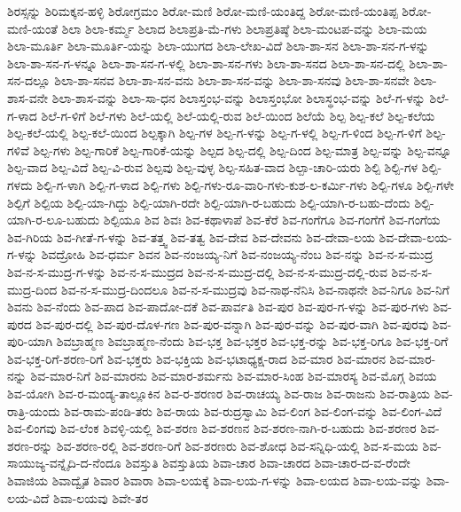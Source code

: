 ಶಿರಸ್ಸನ್ನು
ಶಿರಿಮಕ್ಕನ-ಹಳ್ಳಿ
ಶಿರೋಗ್ರಮಂ
ಶಿರೋ-ಮಣಿ
ಶಿರೋ-ಮಣಿ-ಯಂತಿದ್ದ
ಶಿರೋ-ಮಣಿ-ಯಂತಿಪ್ಪ
ಶಿರೋ-ಮಣಿ-ಯಂತೆ
ಶಿಲಾ
ಶಿಲಾ-ಕರ್ಮ್ಮ
ಶಿಲಾದ
ಶಿಲಾಪ್ರತಿ-ಮೆ-ಗಳು
ಶಿಲಾಪ್ರತಿಷ್ಠೆ
ಶಿಲಾ-ಮಂಟಪ-ವನ್ನು
ಶಿಲಾ-ಮಯ
ಶಿಲಾ-ಮೂರ್ತಿ
ಶಿಲಾ-ಮೂರ್ತಿ-ಯನ್ನು
ಶಿಲಾ-ಯುಗದ
ಶಿಲಾ-ಲೇಖ-ವಿದೆ
ಶಿಲಾ-ಶಾ-ಸನ
ಶಿಲಾ-ಶಾ-ಸನ-ಗ-ಳನ್ನು
ಶಿಲಾ-ಶಾ-ಸನ-ಗ-ಳನ್ನೂ
ಶಿಲಾ-ಶಾ-ಸನ-ಗ-ಳಲ್ಲಿ
ಶಿಲಾ-ಶಾ-ಸನ-ಗಳು
ಶಿಲಾ-ಶಾ-ಸನದ
ಶಿಲಾ-ಶಾ-ಸನ-ದಲ್ಲಿ
ಶಿಲಾ-ಶಾ-ಸನ-ದಲ್ಲೂ
ಶಿಲಾ-ಶಾ-ಸನವ
ಶಿಲಾ-ಶಾ-ಸನ-ವನು
ಶಿಲಾ-ಶಾ-ಸನ-ವನ್ನು
ಶಿಲಾ-ಶಾ-ಸನವು
ಶಿಲಾ-ಶಾ-ಸನವೇ
ಶಿಲಾ-ಶಾಸ-ವನೇ
ಶಿಲಾ-ಶಾಸ-ವನ್ನು
ಶಿಲಾ-ಸಾ-ಧನ
ಶಿಲಾಸ್ತಂಭ-ವನ್ನು
ಶಿಲಾಸ್ತಂಭೋ
ಶಿಲಾಸ್ಥಂಭ-ವನ್ನು
ಶಿಲೆ-ಗ-ಳನ್ನು
ಶಿಲೆ-ಗ-ಳಾದ
ಶಿಲೆ-ಗ-ಳಿಗೆ
ಶಿಲೆ-ಗಳು
ಶಿಲೆ-ಯಲ್ಲಿ
ಶಿಲೆ-ಯಲ್ಲಿ-ರುವ
ಶಿಲೆ-ಯಿಂದ
ಶಿಲೆಯೆ
ಶಿಲ್ಪ
ಶಿಲ್ಪ-ಕಲೆ
ಶಿಲ್ಪ-ಕಲೆಯ
ಶಿಲ್ಪ-ಕಲೆ-ಯಲ್ಲಿ
ಶಿಲ್ಪ-ಕಲೆ-ಯಿಂದ
ಶಿಲ್ಪಕ್ಕಾಗಿ
ಶಿಲ್ಪ-ಗಳ
ಶಿಲ್ಪ-ಗ-ಳನ್ನು
ಶಿಲ್ಪ-ಗ-ಳಲ್ಲಿ
ಶಿಲ್ಪ-ಗ-ಳಿಂದ
ಶಿಲ್ಪ-ಗ-ಳಿಗೆ
ಶಿಲ್ಪ-ಗಳಿವೆ
ಶಿಲ್ಪ-ಗಳು
ಶಿಲ್ಪ-ಗಾರಿಕೆ
ಶಿಲ್ಪ-ಗಾರಿಕೆ-ಯನ್ನು
ಶಿಲ್ಪದ
ಶಿಲ್ಪ-ದಲ್ಲಿ
ಶಿಲ್ಪ-ದಿಂದ
ಶಿಲ್ಪ-ಮಾತ್ರ
ಶಿಲ್ಪ-ವನ್ನು
ಶಿಲ್ಪ-ವನ್ನೂ
ಶಿಲ್ಪ-ವಾದ
ಶಿಲ್ಪ-ವಿದೆ
ಶಿಲ್ಪ-ವಿ-ರುವ
ಶಿಲ್ಪವು
ಶಿಲ್ಪ-ವುಳ್ಳ
ಶಿಲ್ಪ-ಸಹಿತ-ವಾದ
ಶಿಲ್ಪಾ-ಚಾರಿ-ಯರು
ಶಿಲ್ಪಿ
ಶಿಲ್ಪಿ-ಗಳ
ಶಿಲ್ಪಿ-ಗಳದು
ಶಿಲ್ಪಿ-ಗ-ಳಾಗಿ
ಶಿಲ್ಪಿ-ಗ-ಳಾದ
ಶಿಲ್ಪಿ-ಗಳು
ಶಿಲ್ಪಿ-ಗಳು-ರೂ-ವಾರಿ-ಗಳು-ಕುಶ-ಲ-ಕರ್ಮಿ-ಗಳು
ಶಿಲ್ಪಿ-ಗಳೂ
ಶಿಲ್ಪಿ-ಗಳೇ
ಶಿಲ್ಪಿಗೆ
ಶಿಲ್ಪಿಯ
ಶಿಲ್ಪಿ-ಯಾ-ಗಿದ್ದು
ಶಿಲ್ಪಿ-ಯಾಗಿ-ರದೇ
ಶಿಲ್ಪಿ-ಯಾಗಿ-ರ-ಬಹುದು
ಶಿಲ್ಪಿ-ಯಾಗಿ-ರ-ಬಹು-ದೆಂದು
ಶಿಲ್ಪಿ-ಯಾಗಿ-ರ-ಲೂ-ಬಹುದು
ಶಿಲ್ಪಿಯೂ
ಶಿವ
ಶಿವಃ
ಶಿವ-ಕಥಾಳಾಪೆ
ಶಿವ-ಕೆರೆ
ಶಿವ-ಗಂಗೆಗೂ
ಶಿವ-ಗಂಗೆಗೆ
ಶಿವ-ಗಂಗೆಯ
ಶಿವ-ಗಿರಿಯ
ಶಿವ-ಗೀತೆ-ಗ-ಳನ್ನು
ಶಿವ-ತತ್ತ್ವ
ಶಿವ-ತತ್ವ
ಶಿವ-ದೇವ
ಶಿವ-ದೇವನು
ಶಿವ-ದೇವಾ-ಲಯ
ಶಿವ-ದೇವಾ-ಲಯ-ಗ-ಳನ್ನು
ಶಿವದ್ರೋಹಿ
ಶಿವ-ಧರ್ಮ
ಶಿವನ
ಶಿವ-ನಂಜಯ್ಯ-ನಿಗೆ
ಶಿವ-ನಂಜಯ್ಯ-ನೆಂಬ
ಶಿವ-ನನ್ನು
ಶಿವ-ನ-ಸ-ಮುದ್ರ
ಶಿವ-ನ-ಸ-ಮುದ್ರ-ಗ-ಳನ್ನು
ಶಿವ-ನ-ಸ-ಮುದ್ರದ
ಶಿವ-ನ-ಸ-ಮುದ್ರ-ದಲ್ಲಿ
ಶಿವ-ನ-ಸ-ಮುದ್ರ-ದಲ್ಲಿ-ರುವ
ಶಿವ-ನ-ಸ-ಮುದ್ರ-ದಿಂದ
ಶಿವ-ನ-ಸ-ಮುದ್ರ-ದಿಂದಲೂ
ಶಿವ-ನ-ಸ-ಮುದ್ರವು
ಶಿವ-ನಾಥ-ನೆನಿಸಿ
ಶಿವ-ನಾಥನೇ
ಶಿವ-ನಿಗೂ
ಶಿವ-ನಿಗೆ
ಶಿವನು
ಶಿವ-ನೆಂದು
ಶಿವ-ಪಾದ
ಶಿವ-ಪಾದೋ-ದಕೆ
ಶಿವ-ಪಾರ್ವತಿ
ಶಿವ-ಪುರ
ಶಿವ-ಪುರ-ಗ-ಳನ್ನು
ಶಿವ-ಪುರ-ಗಳು
ಶಿವ-ಪುರದ
ಶಿವ-ಪುರ-ದಲ್ಲಿ
ಶಿವ-ಪುರ-ದೊಳ-ಗಣ
ಶಿವ-ಪುರ-ವನ್ನಾಗಿ
ಶಿವ-ಪುರ-ವನ್ನು
ಶಿವ-ಪುರ-ವಾಗಿ
ಶಿವ-ಪುರವು
ಶಿವ-ಪುರಿ-ಯಾಗಿ
ಶಿವಬ್ರಾಹ್ಮಣ
ಶಿವಬ್ರಾಹ್ಮಣ-ನೆಂದು
ಶಿವ-ಭಕ್ತ
ಶಿವ-ಭಕ್ತರ
ಶಿವ-ಭಕ್ತ-ರನ್ನು
ಶಿವ-ಭಕ್ತ-ರಿಗೂ
ಶಿವ-ಭಕ್ತ-ರಿಗೆ
ಶಿವ-ಭಕ್ತ-ರಿಗೆ-ಶರಣ-ರಿಗೆ
ಶಿವ-ಭಕ್ತರು
ಶಿವ-ಭಕ್ತಿಯ
ಶಿವ-ಭಟಾಧ್ಯಕ್ಷ-ರಾದ
ಶಿವ-ಮಾರ
ಶಿವ-ಮಾರನ
ಶಿವ-ಮಾರ-ನನ್ನು
ಶಿವ-ಮಾರ-ನಿಗೆ
ಶಿವ-ಮಾರನು
ಶಿವ-ಮಾರ-ಶರ್ಮನು
ಶಿವ-ಮಾರ-ಸಿಂಹ
ಶಿವ-ಮಾರಸ್ಯ
ಶಿವ-ಮೊಗ್ಗ
ಶಿವಯ
ಶಿವ-ಯೋಗಿ
ಶಿವ-ರ-ಮಂಡ್ಯ-ತಾಲ್ಲೂಕಿನ
ಶಿವ-ರ-ಶರಣರ
ಶಿವ-ರಾಚಯ್ಯ
ಶಿವ-ರಾಜ
ಶಿವ-ರಾಜನು
ಶಿವ-ರಾತ್ರಿಯ
ಶಿವ-ರಾತ್ರಿ-ಯಂದು
ಶಿವ-ರಾಮ-ಪಂಡಿ-ತರು
ಶಿವ-ರಾಯ
ಶಿವ-ರುದ್ರಸ್ವಾಮಿ
ಶಿವ-ಲಿಂಗ
ಶಿವ-ಲಿಂಗ-ವನ್ನು
ಶಿವ-ಲಿಂಗ-ವಿದೆ
ಶಿವ-ಲಿಂಗವು
ಶಿವ-ಲೆಂಕ
ಶಿವಳ್ಳಿ-ಯಲ್ಲಿ
ಶಿವ-ಶರಣ
ಶಿವ-ಶರಣನ
ಶಿವ-ಶರಣ-ನಾಗಿ-ರ-ಬಹುದು
ಶಿವ-ಶರಣರ
ಶಿವ-ಶರಣ-ರನ್ನು
ಶಿವ-ಶರಣ-ರಲ್ಲಿ
ಶಿವ-ಶರಣ-ರಿಗೆ
ಶಿವ-ಶರಣರು
ಶಿವ-ಶೋಧ
ಶಿವ-ಸನ್ನಿಧಿ-ಯಲ್ಲಿ
ಶಿವ-ಸ-ಮಯ
ಶಿವ-ಸಾಯುಜ್ಯ-ವನ್ನೈದಿ-ದ-ನೆಂದೂ
ಶಿವಸ್ತುತಿ
ಶಿವಸ್ತುತಿಯ
ಶಿವಾ-ಚಾರ
ಶಿವಾ-ಚಾರದ
ಶಿವಾ-ಚಾರ-ದ-ವ-ರೆಂದೇ
ಶಿವಾಜಿಯ
ಶಿವಾದ್ವೈತ
ಶಿವಾರ
ಶಿವಾರಾ
ಶಿವಾ-ಲಯಕ್ಕೆ
ಶಿವಾ-ಲಯ-ಗ-ಳನ್ನು
ಶಿವಾ-ಲಯದ
ಶಿವಾ-ಲಯ-ವನ್ನು
ಶಿವಾ-ಲಯ-ವಿದೆ
ಶಿವಾ-ಲಯವು
ಶಿವೇ-ತರ
